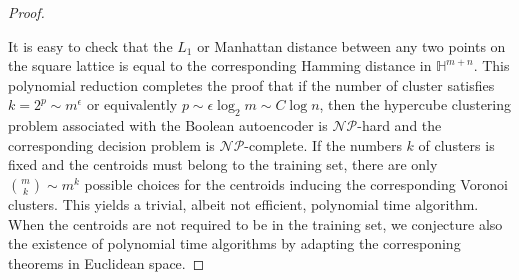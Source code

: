 \begin{proof}
\begin{multicols}{2}
\begin{center}
    \end{center}

        \end{multicols}
    
    

    It is easy to check that the $L_1$ or Manhattan distance between any two points on the square lattice is equal to the corresponding Hamming distance in $\mathbb{H}^{m+n}$. This polynomial reduction completes the proof that if the number of cluster satisfies $k = 2^p \sim m^\epsilon$ or equivalently $p \sim \epsilon \log_2 m \sim C \log n$, then the hypercube clustering problem associated with the Boolean autoencoder is $\mathcal{NP}$-hard and the corresponding decision problem is $\mathcal{NP}$-complete. If the numbers $k$ of clusters is fixed and the centroids must belong to the training set, there are only $\binom{m}{k} \sim m^k$ possible choices for the centroids inducing the corresponding Voronoi clusters. This yields a trivial, albeit not efficient, polynomial time algorithm. When the centroids are not required to be in the training set, we conjecture also the existence of polynomial time algorithms by adapting the corresponing theorems in Euclidean space. 
\end{proof}

